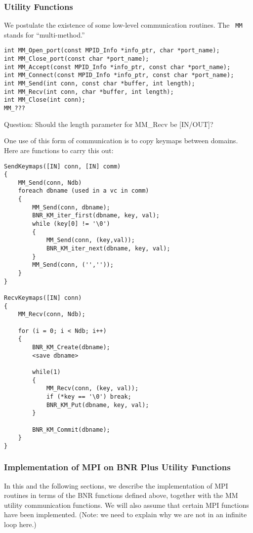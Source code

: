 \documentclass{article}
\begin{document}
\subsubsection{Utility Functions}

We postulate the existence of some low-level communication routines.  The {\tt
  MM} stands for ``multi-method.''

\begin{verbatim}
int MM_Open_port(const MPID_Info *info_ptr, char *port_name);
int MM_Close_port(const char *port_name);
int MM_Accept(const MPID_Info *info_ptr, const char *port_name);
int MM_Connect(const MPID_Info *info_ptr, const char *port_name);
int MM_Send(int conn, const char *buffer, int length);
int MM_Recv(int conn, char *buffer, int length);
int MM_Close(int conn);
MM_???
\end{verbatim}
Question: Should the length parameter for MM_Recv be [IN/OUT]?

One use of this form of communication is to copy keymaps between domains.
Here are functions to carry this out:

\begin{verbatim}
SendKeymaps([IN] conn, [IN] comm)
{
    MM_Send(conn, Ndb)
    foreach dbname (used in a vc in comm)
    {
        MM_Send(conn, dbname);
        BNR_KM_iter_first(dbname, key, val);
        while (key[0] != '\0')
        {
            MM_Send(conn, (key,val));
            BNR_KM_iter_next(dbname, key, val);
        }
        MM_Send(conn, ('',''));
    }
}

RecvKeymaps([IN] conn)
{
    MM_Recv(conn, Ndb);
    
    for (i = 0; i < Ndb; i++)
    {
        BNR_KM_Create(dbname);
        <save dbname>
        
        while(1)
        {
            MM_Recv(conn, (key, val));
            if (*key == '\0') break;
            BNR_KM_Put(dbname, key, val);
        }

        BNR_KM_Commit(dbname);
    }
}
\end{verbatim}

\subsubsection{Implementation of MPI on BNR Plus Utility Functions}

In this and the following sections, we describe the implementation of MPI
routines in terms of the BNR functions defined above, together with the
MM utility communication functions.  We will also assume that certain
MPI functions have been implemented.  (Note:  we need to explain why we are
not in an infinite loop here.)
\end{document}
